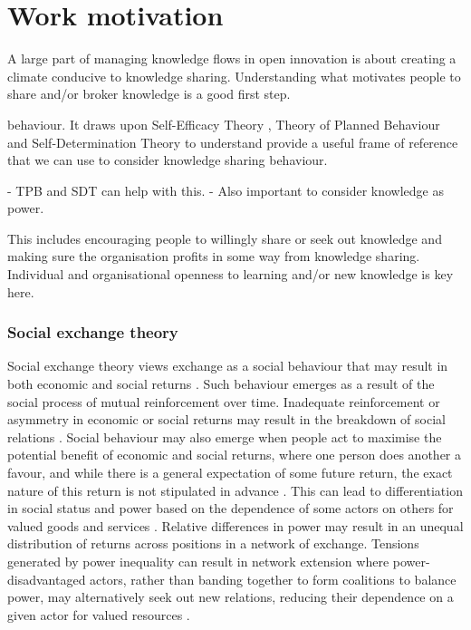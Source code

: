 \section{Work motivation}

A large part of managing knowledge flows in open innovation is about creating a climate conducive to knowledge sharing. Understanding what motivates people to share and/or broker knowledge is a good first step. \medskip



behaviour. It draws upon Self-Efficacy Theory \citep{bandura1994self}, Theory of Planned Behaviour \citep{ajzen1991theory} and Self-Determination Theory \citep{deci1985general} to understand  provide a useful frame of reference that we can use to consider knowledge sharing behaviour.


- TPB and SDT can help with this.
- Also important to consider knowledge as power.

This includes encouraging people to willingly share or seek out knowledge and making sure the organisation profits in some way from knowledge sharing. Individual and organisational openness to learning and/or new knowledge is key here.

\subsubsection{Social exchange theory}

Social exchange theory views exchange as a social behaviour that may result in both economic and social returns \citep{lambe2001social}. Such behaviour emerges as a result of the social process of mutual reinforcement over time. Inadequate reinforcement or asymmetry in economic or social returns may result in the breakdown of social relations \citep{homans1961social}. Social behaviour may also emerge when people act to maximise the potential benefit of economic and social returns, where one person does another a favour, and while there is a general expectation of some future return, the exact nature of this return is not stipulated in advance \citep{blau1986exchange}. This can lead to differentiation in social status and power based on the dependence of some actors on others for valued goods and services \citep{emerson1962power}. Relative differences in power may result in an unequal distribution of returns across positions in a network of exchange. Tensions generated by power inequality can result in network extension where power-disadvantaged actors, rather than banding together to form coalitions to balance power, may alternatively seek out new relations, reducing their dependence on a given actor for valued resources \citep{cook2013social}. 

